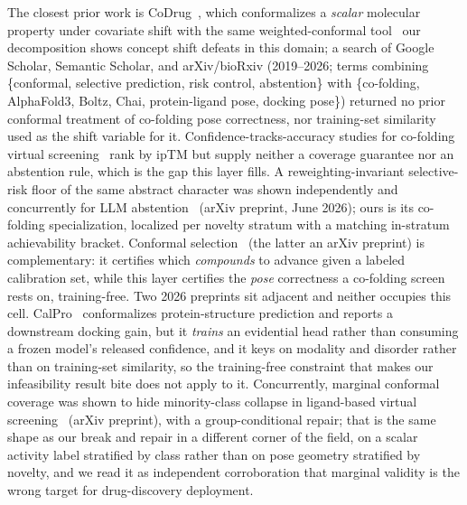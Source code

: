 \documentclass[10pt]{article}
\begin{document}
The closest prior work is CoDrug~\citep{codrug}, which conformalizes a \emph{scalar} molecular property
under covariate shift with the same weighted-conformal tool~\citep{tibshirani2019} our decomposition shows
concept shift defeats in this domain; a search of Google Scholar, Semantic Scholar, and arXiv/bioRxiv
(2019--2026; terms combining \{conformal, selective prediction, risk control, abstention\} with \{co-folding,
AlphaFold3, Boltz, Chai, protein-ligand pose, docking pose\}) returned no prior conformal treatment of
co-folding pose correctness, nor training-set similarity used as the shift variable for it. Confidence-tracks-accuracy
studies for co-folding virtual screening~\citep{shen2026vs} rank by ipTM but supply neither a coverage
guarantee nor an abstention rule, which is the gap this layer fills. A reweighting-invariant selective-risk
floor of the same abstract character was shown independently and concurrently for LLM
abstention~\citep{crcgupta} (arXiv preprint, June 2026); ours is its co-folding specialization, localized
per novelty stratum with a matching in-stratum achievability bracket. Conformal
selection~\citep{jin2023selection,bai2026score} (the latter an arXiv preprint) is complementary: it certifies
which \emph{compounds} to advance given a labeled calibration set, while this layer certifies the
\emph{pose} correctness a co-folding screen rests on, training-free. Two 2026 preprints sit adjacent and
neither occupies this cell. CalPro~\citep{calpro} conformalizes protein-structure prediction and reports a
downstream docking gain, but it \emph{trains} an evidential head rather than consuming a frozen model's
released confidence, and it keys on modality and disorder rather than on training-set similarity, so the
training-free constraint that makes our infeasibility result bite does not apply to it. Concurrently, marginal
conformal coverage was shown to hide minority-class collapse in ligand-based virtual
screening~\citep{quietfailure} (arXiv preprint), with a group-conditional repair; that is the same shape as
our break and repair in a different corner of the field, on a scalar activity label stratified by class
rather than on pose geometry stratified by novelty, and we read it as independent corroboration that
marginal validity is the wrong target for drug-discovery deployment.
\end{document}
